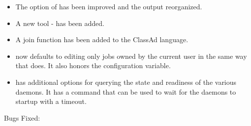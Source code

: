 \begin{itemize}
\item The  option of  has been improved and the output reorganized.

\item A new tool -  has been added.

\item A join function has been added to the ClassAd language.

\item {} now defaults to editing only jobs owned by the current user in the same way that
 does. It also honors the  configuration variable.

\item {} has additional options for querying the state and readiness of the various daemons.
It has a command that can be used to wait for the daemons to startup with a timeout.

\end{itemize}

\noindent Bugs Fixed:

